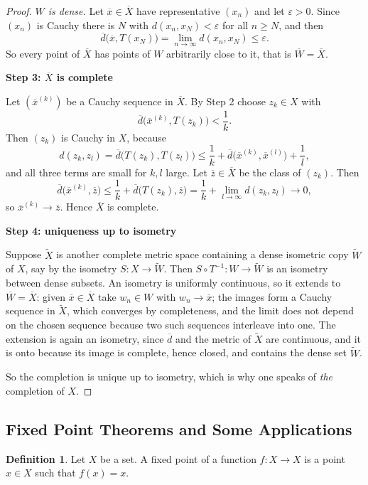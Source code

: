 \documentclass[11pt,a4paper]{article}
\theoremstyle{definition}
\newtheorem{defn}[thm]{Definition}
\newcommand{\subhead}[1]{%
  \par\medskip\noindent\textbf{#1}\par\nobreak\smallskip}
\begin{document}
\begin{proof}
\emph{$W$ is dense.} Let $\overline{x}\in\overline{X}$ have representative
$(x_n)$ and let $\varepsilon>0$. Since $(x_n)$ is Cauchy there is $N$ with
$d(x_n,x_N)<\varepsilon$ for all $n\geq N$, and then
$$\overline{d}\big(\overline{x},T(x_N)\big)=\lim_{n\rightarrow\infty}d(x_n,x_N)
\leq\varepsilon .$$
So every point of $\overline{X}$ has points of $W$ arbitrarily close to it, that
is $\overline{W}=\overline{X}$.

\subhead{Step 3: $\overline{X}$ is complete}
Let $(\overline{x}^{(k)})$ be a Cauchy sequence in $\overline{X}$. By Step 2
choose $z_k\in X$ with
$$\overline{d}\big(\overline{x}^{(k)},T(z_k)\big)<\frac{1}{k} .$$
Then $(z_k)$ is Cauchy in $X$, because
$$d(z_k,z_l)=\overline{d}\big(T(z_k),T(z_l)\big)
\leq\frac1k+\overline{d}\big(\overline{x}^{(k)},\overline{x}^{(l)}\big)+\frac1l ,$$
and all three terms are small for $k,l$ large. Let $\overline{z}\in\overline{X}$
be the class of $(z_k)$. Then
$$\overline{d}\big(\overline{x}^{(k)},\overline{z}\big)
\leq\frac1k+\overline{d}\big(T(z_k),\overline{z}\big)
=\frac1k+\lim_{l\rightarrow\infty}d(z_k,z_l)\longrightarrow 0 ,$$
so $\overline{x}^{(k)}\rightarrow\overline{z}$. Hence $\overline{X}$ is complete.

\subhead{Step 4: uniqueness up to isometry}
Suppose $\widetilde{X}$ is another complete metric space containing a dense
isometric copy $\widetilde{W}$ of $X$, say by the isometry $S:X\rightarrow
\widetilde{W}$. Then $S\circ T^{-1}:W\rightarrow\widetilde{W}$ is an isometry
between dense subsets. An isometry is uniformly continuous, so it extends to
$\overline{W}=\overline{X}$: given $\overline{x}\in\overline{X}$ take
$w_n\in W$ with $w_n\rightarrow\overline{x}$; the images form a Cauchy sequence
in $\widetilde{X}$, which converges by completeness, and the limit does not
depend on the chosen sequence because two such sequences interleave into one.
The extension is again an isometry, since $\overline{d}$ and the metric of
$\widetilde{X}$ are continuous, and it is onto because its image is complete,
hence closed, and contains the dense set $\widetilde{W}$.

So the completion is unique up to isometry, which is why one speaks of
\emph{the} completion of $X$.
\end{proof}


\pagebreak
\subsection{Fixed Point Theorems and Some Applications}
\begin{defn}
Let $X$ be a set. A fixed point of a function $f:X\rightarrow X$ is a point $x\in X$ such that $f(x)=x$.

\end{defn}
\end{document}
